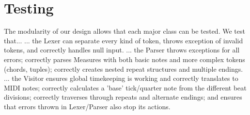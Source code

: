 \documentclass{amsart}
\begin{document}
\section{ Testing }
The modularity of our design allows that each major class can be tested.  We test that...
... the Lexer can separate every kind of token, throws exception of invalid tokens, and correctly handles null input.
... the Parser throws exceptions for all errors; correctly parses Measures with both basic notes and more complex tokens (chords, tuples); correctly creates nested repeat structures and multiple endings.  
... the Visitor ensures global timekeeping is working and correctly translates to MIDI notes; correctly calculates a 'base' tick/quarter note from the different beat divisions; correctly traverses through repeats and alternate endings; and ensures that errors thrown in Lexer/Parser also stop its actions.   
\end{document}

